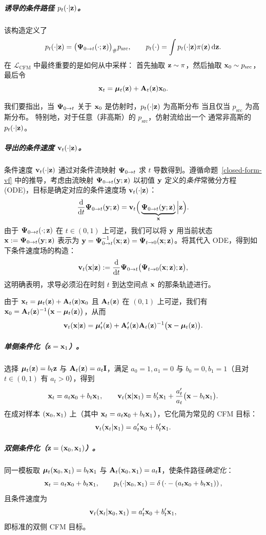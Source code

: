 \subparagraph{诱导的条件路径 $p_t(\cdot|{\mathbf{z}})$。}
该构造定义了
\[
p_t(\cdot|{\mathbf{z}}) = \bigl({\bm{\Psi}}_{0\to t}( \cdot ;{\mathbf{z}})\bigr)_{\#} p_{\mathrm{src}},
\qquad
p_t(\cdot)  =  \int p_t(\cdot|{\mathbf{z}})\pi({\mathbf{z}})\mathop{}\!\mathrm{d}{\mathbf{z}}.
\]
在 $\mathcal{L}_{\mathrm{CFM}}$ 中最终重要的是如何从中采样：
首先抽取 ${\mathbf{z}} \sim \pi$，然后抽取 ${\mathbf{x}}_0 \sim p_{\mathrm{src}}$，最后令
\[
{\mathbf{x}}_t = \bm\mu_t({\mathbf{z}}) + {\mathbf{A}}_t({\mathbf{z}}){\mathbf{x}}_0.
\]


我们要指出，当 ${\bm{\Psi}}_{0\to t}$ 关于 ${\mathbf{x}}_0$ 是仿射时，$p_t( \cdot | {\mathbf{z}})$ 为高斯分布
当且仅当 $p_{\mathrm{src}}$ 为高斯分布。
特别地，对于任意（非高斯）的 $p_{\mathrm{src}}$，仿射流给出一个
通常非高斯的 $p_t(\cdot|{\mathbf{z}})$。


\subparagraph{导出的条件速度 ${\mathbf{v}}_t(\cdot|{\mathbf{z}})$。} 条件速度 ${\mathbf{v}}_t(\cdot|{\mathbf{z}})$ 通过对条件流映射 ${\bm{\Psi}}_{0\to t}$ 求 $t$ 导数得到。遵循命题~\ref{closed-form-vf} 中的推导，考虑由流映射 ${\bm{\Psi}}_{0\to t}({\mathbf{y}};{\mathbf{z}})$ 以初值 ${\mathbf{y}}$ 定义的\emph{条件}常微分方程 (ODE)，目标是确定对应的条件速度场 ${\mathbf{v}}_t(\cdot|{\mathbf{z}})$：
\[
\frac{\mathop{}\!\mathrm{d}}{\mathop{}\!\mathrm{d} t} {\bm{\Psi}}_{0\to t}({\mathbf{y}};{\mathbf{z}})
= {\mathbf{v}}_t \Big(\underbrace{{\bm{\Psi}}_{0\to t}({\mathbf{y}};{\mathbf{z}})}_{{\mathbf{x}}} \Big| {\mathbf{z}}\Big).
\]
由于 ${\bm{\Psi}}_{0\to t}(\cdot;{\mathbf{z}})$ 在 $t\in(0,1)$ 上可逆，我们可以将 ${\mathbf{y}}$ 用当前状态 ${\mathbf{x}}:={\bm{\Psi}}_{0\to t}({\mathbf{y}};{\mathbf{z}})$ 表示为 ${\mathbf{y}}={\bm{\Psi}}_{0\to t}^{-1}({\mathbf{x}};{\mathbf{z}})={\bm{\Psi}}_{t\to 0}({\mathbf{x}};{\mathbf{z}})$。将其代入 ODE，得到如下条件速度场的构造：
\[
{\mathbf{v}}_t({\mathbf{x}}|{\mathbf{z}})
:= \frac{\mathop{}\!\mathrm{d}}{\mathop{}\!\mathrm{d} t} {\bm{\Psi}}_{0\to t} \bigl({\bm{\Psi}}_{t\to 0}({\mathbf{x}};{\mathbf{z}});{\mathbf{z}}\bigr),
\]
这明确表明，求导必须沿在时刻 $t$ 到达空间点 ${\mathbf{x}}$ 的那条轨迹进行。


由于 ${\mathbf{x}}_t=\bm\mu_t({\mathbf{z}})+{\mathbf{A}}_t({\mathbf{z}}){\mathbf{x}}_0$ 且 ${\mathbf{A}}_t({\mathbf{z}})$ 在 $(0,1)$ 上可逆，我们有 ${\mathbf{x}}_0={\mathbf{A}}_t({\mathbf{z}})^{-1}\bigl({\mathbf{x}}-\bm\mu_t({\mathbf{z}})\bigr)$，从而
\[
{\mathbf{v}}_t({\mathbf{x}}|{\mathbf{z}})
 = 
\bm\mu_t'({\mathbf{z}}) + {\mathbf{A}}_t'({\mathbf{z}}) {\mathbf{A}}_t({\mathbf{z}})^{-1} \bigl({\mathbf{x}}-\bm\mu_t({\mathbf{z}})\bigr).
\]


\subparagraph{单侧条件化（${\mathbf{z}}={\mathbf{x}}_1$）。}
选择 $\bm\mu_t({\mathbf{z}})=b_t {\mathbf{z}}$ 与 ${\mathbf{A}}_t({\mathbf{z}})=a_t {\mathbf{I}}$，满足 $a_0=1,a_1=0$ 与 $b_0=0,b_1=1$（且对 $t\in(0,1)$ 有 $a_t>0$），得到
\[
{\mathbf{x}}_t = a_t {\mathbf{x}}_0 + b_t {\mathbf{x}}_1,
\qquad
{\mathbf{v}}_t({\mathbf{x}}|{\mathbf{x}}_1) = b_t' {\mathbf{x}}_1 + \frac{a_t'}{a_t} \bigl({\mathbf{x}}-b_t{\mathbf{x}}_1\bigr).
\]
在成对样本 $({\mathbf{x}}_0,{\mathbf{x}}_1)$ 上（其中 ${\mathbf{x}}_t=a_t{\mathbf{x}}_0+b_t{\mathbf{x}}_1$），它化简为常见的 CFM 目标：
\[
{\mathbf{v}}_t({\mathbf{x}}_t|{\mathbf{x}}_1)=a_t' {\mathbf{x}}_0 + b_t' {\mathbf{x}}_1.
\]

\subparagraph{双侧条件化（${\mathbf{z}}=({\mathbf{x}}_0,{\mathbf{x}}_1)$）。}
同一模板取 $\bm\mu_t({\mathbf{x}}_0,{\mathbf{x}}_1)=b_t {\mathbf{x}}_1$ 与 ${\mathbf{A}}_t({\mathbf{x}}_0,{\mathbf{x}}_1)=a_t {\mathbf{I}}$，使条件路径\emph{确定化}：
\[
{\mathbf{x}}_t=a_t {\mathbf{x}}_0+b_t {\mathbf{x}}_1,
\qquad
p_t(\cdot|{\mathbf{x}}_0,{\mathbf{x}}_1)=\delta\left(\cdot - (a_t{\mathbf{x}}_0+b_t{\mathbf{x}}_1)\right),
\]
且条件速度为
\[
{\mathbf{v}}_t({\mathbf{x}}_t|{\mathbf{x}}_0,{\mathbf{x}}_1)=a_t' {\mathbf{x}}_0+b_t' {\mathbf{x}}_1,
\]
即标准的双侧 CFM 目标。

